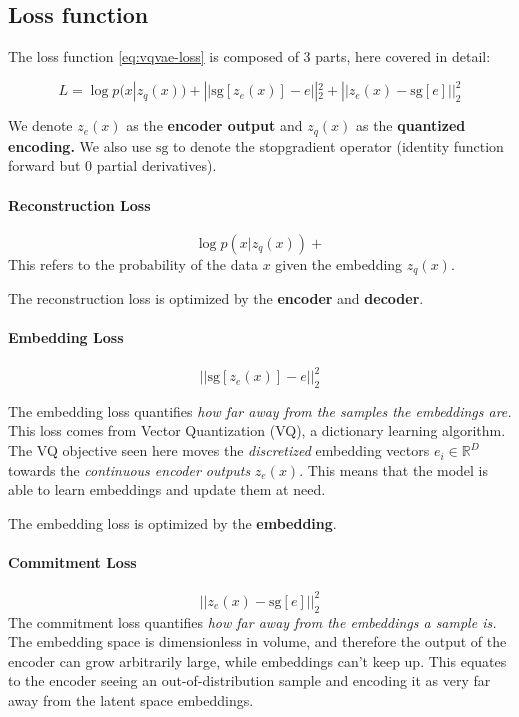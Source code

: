 \subsection{Loss function}

The loss function \cref{eq:vqvae-loss} is composed of 3 parts, here covered in detail:

\begin{equation}
    L = 
    \log p(x| z_q(x)) + 
    || \mathrm{sg}[z_e (x) ] - e ||_2^2 + 
    || z_e (x)  - \mathrm{sg}[e] ||_2^2
    \label{eq:vqvae-loss}
\end{equation}

We denote \(z_e(x)\) as the \textbf{encoder output} and \(z_q(x)\) as the \textbf{quantized encoding.} 
We also use \(\mathrm{sg}\) to denote the stopgradient operator (identity function forward but 0 partial derivatives).

\paragraph{Reconstruction Loss}
\[
    \log p(x| z_q(x)) +     
\]
This refers to the probability of the data \(x\) given the embedding \(z_q(x)\).

The reconstruction loss is optimized by the \textbf{encoder} and \textbf{decoder}.

\paragraph{Embedding Loss}
\[
    || \mathrm{sg}[z_e (x) ] - e ||_2^2 
\]

The embedding loss quantifies \textit{how far away from the samples the embeddings are.}
This loss comes from Vector Quantization (VQ), a dictionary learning algorithm. 
The VQ objective seen here moves the \textit{discretized} embedding vectors \(e_i \in \mathbb{R}^D\) towards the \textit{continuous encoder outputs} \(z_e(x)\).
This means that the model is able to learn embeddings and update them at need. 

The embedding loss is optimized by the \textbf{embedding}.

\paragraph{Commitment Loss}
\[
    || z_e (x)  - \mathrm{sg}[e] ||_2^2
\]
The commitment loss quantifies \textit{how far away from the embeddings a sample is.}
The embedding space is dimensionless in volume, and therefore the output of the encoder can grow arbitrarily large, while embeddings can't keep up. 
This equates to the encoder seeing an out-of-distribution sample and encoding it as very far away from the latent space embeddings. 

